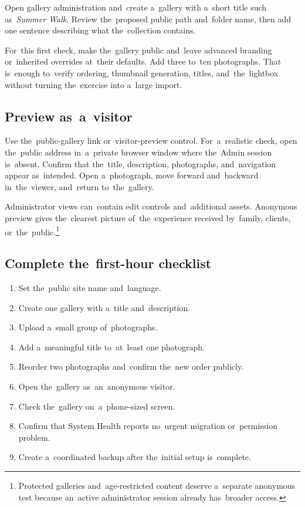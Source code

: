 \documentclass[11pt,a4paper]{article}
\begin{document}
Open gallery administration and~create a~gallery with a~short title such
as~\emph{Summer Walk}. Review the~proposed public path and~folder name, then add
one sentence describing what the~collection contains.

For~this first check, make the~gallery public and~leave advanced branding
or~inherited overrides at~their defaults. Add three to~ten photographs. That
is~enough to~verify ordering, thumbnail generation, titles, and~the~lightbox
without turning the~exercise into a~large import.

\subsection{Preview as~a~visitor}

Use the~public-gallery link or~visitor-preview control. For~a~realistic check,
open the~public address in~a~private browser window where the~Admin session
is~absent. Confirm that the~title, description, photographs, and~navigation
appear as~intended. Open a~photograph, move forward and~backward in~the~viewer,
and~return to~the~gallery.

Administrator views can~contain edit controls and~additional assets. Anonymous
preview gives the~clearest picture of~the~experience received by~family,
clients, or~the~public.\footnote{Protected galleries and~age-restricted content
deserve a~separate anonymous test because an~active administrator session
already has~broader access.}

\subsection{Complete the~first-hour checklist}

\begin{enumerate}
  \item Set the~public site name and~language.
  \item Create one gallery with a~title and~description.
  \item Upload a~small group of~photographs.
  \item Add a~meaningful title to~at~least one photograph.
  \item Reorder two photographs and~confirm the~new order publicly.
  \item Open the~gallery as~an~anonymous visitor.
  \item Check the~gallery on~a~phone-sized screen.
  \item Confirm that System Health reports no~urgent migration or~permission
  problem.
  \item Create a~coordinated backup after the~initial setup is~complete.
\end{enumerate}
\end{document}
